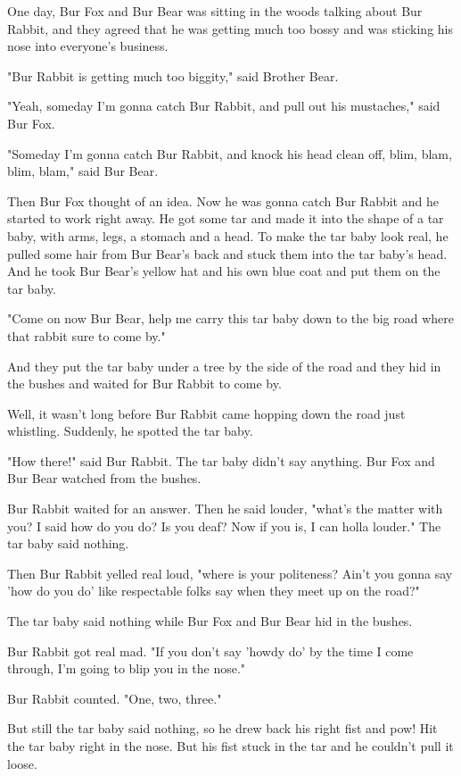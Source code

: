 One day, Bur Fox and Bur Bear was sitting in the woods talking about Bur Rabbit, and they agreed that he was getting much too bossy and was sticking his nose into everyone's business.

"Bur Rabbit is getting much too biggity," said Brother Bear.

"Yeah, someday I'm gonna catch Bur Rabbit, and pull out his mustaches," said Bur Fox.

"Someday I'm gonna catch Bur Rabbit, and knock his head clean off, blim, blam, blim, blam," said Bur Bear.

Then Bur Fox thought of an idea. Now he was gonna catch Bur Rabbit and he started to work right away. He got some tar and made it into the shape of a tar baby, with arms, legs, a stomach and a head. To make the tar baby look real, he pulled some hair from Bur Bear's back and stuck them into the tar baby's head. And he took Bur Bear's yellow hat and his own blue coat and put them on the tar baby.

"Come on now Bur Bear, help me carry this tar baby down to the big road where that rabbit sure to come by."

And they put the tar baby under a tree by the side of the road and they hid in the bushes and waited for Bur Rabbit to come by.

Well, it wasn't long before Bur Rabbit came hopping down the road just whistling. Suddenly, he spotted the tar baby.

"How there!" said Bur Rabbit. The tar baby didn't say anything. Bur Fox and Bur Bear watched from the bushes.

Bur Rabbit waited for an answer. Then he said louder, "what's the matter with you? I said how do you do? Is you deaf? Now if you is, I can holla louder." The tar baby said nothing.

Then Bur Rabbit yelled real loud, "where is your politeness? Ain't you gonna say 'how do you do' like respectable folks say when they meet up on the road?"

The tar baby said nothing while Bur Fox and Bur Bear hid in the bushes.

Bur Rabbit got real mad. "If you don't say 'howdy do' by the time I come through, I'm going to blip you in the nose."

Bur Rabbit counted. "One, two, three."

But still the tar baby said nothing, so he drew back his right fist and pow! Hit the tar baby right in the nose. But his fist stuck in the tar and he couldn't pull it loose.

